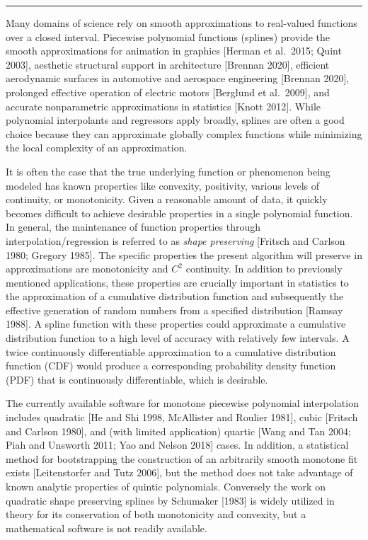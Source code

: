 \bigskip\hrule\bigskip\medskip
{}

Many domains of science rely on smooth approximations to real-valued
functions over a closed interval. Piecewise polynomial functions
(splines) provide the smooth approximations for animation in graphics
[Herman et al.\ 2015; Quint 2003], aesthetic structural support in
architecture [Brennan 2020], efficient aerodynamic surfaces in
automotive and aerospace engineering [Brennan 2020], prolonged
effective operation of electric motors [Berglund et al.\ 2009], and
accurate nonparametric approximations in statistics [Knott
2012]. While polynomial interpolants and regressors apply broadly,
splines are often a good choice because they can approximate globally
complex functions while minimizing the local complexity of an
approximation.

It is often the case that the true underlying function or phenomenon
being modeled has known properties like convexity, positivity,
various levels of continuity, or monotonicity. Given a reasonable
amount of data, it quickly becomes difficult to achieve desirable
properties in a single polynomial function. In general, the
maintenance of function properties through interpolation/regression is
referred to as {\it shape preserving} [Fritsch and Carlson 1980;
Gregory 1985]. The specific properties the present algorithm will
preserve in approximations are monotonicity and $C^2$ continuity. In
addition to previously mentioned applications, these properties are
crucially important in statistics to the approximation of a cumulative
distribution function and subsequently the effective generation of
random numbers from a specified distribution [Ramsay 1988].  A spline
function with these properties could approximate a cumulative
distribution function to a high level of accuracy with relatively few
intervals. A twice continuously differentiable approximation to a
cumulative distribution function (CDF) would produce a corresponding
probability density function (PDF) that is continuously
differentiable, which is desirable.

The currently available software for monotone piecewise polynomial
interpolation includes quadratic [He and Shi 1998, McAllister and
Roulier 1981], cubic [Fritsch and Carlson 1980], and (with limited
application) quartic [Wang and Tan 2004; Piah and Unsworth 2011; Yao
and Nelson 2018] cases. In addition, a statistical method for
bootstrapping the construction of an arbitrarily smooth monotone fit
exists [Leitenstorfer and Tutz 2006], but the method does not take
advantage of known analytic properties of quintic polynomials.
Conversely the work on quadratic shape preserving splines by Schumaker
[1983] is widely utilized in theory for its conservation of both
monotonicity and convexity, but a mathematical software is not readily
available.

